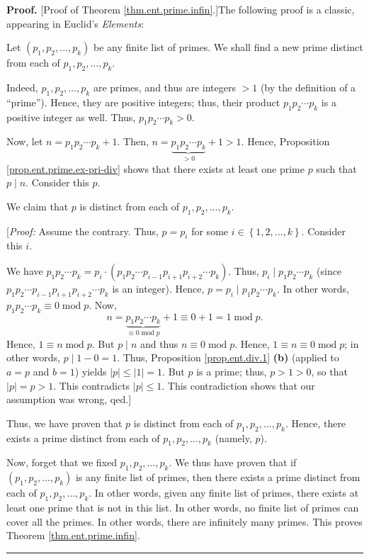 \documentclass[numbers=enddot,12pt,final,onecolumn,notitlepage]{scrartcl}%
\numberwithin{exer}{subsection}
\theoremstyle{definition}
\newenvironment{proof}[1][Proof]{\noindent\textbf{#1.} }{\ \rule{0.5em}{0.5em}}
\begin{document}
\begin{proof}
[Proof of Theorem \ref{thm.ent.prime.infin}.]The following proof is a classic,
appearing in Euclid's \textit{Elements}:

Let $\left(  p_{1},p_{2},\ldots,p_{k}\right)  $ be any finite list of primes.
We shall find a new prime distinct from each of $p_{1},p_{2},\ldots,p_{k}$.

Indeed, $p_{1},p_{2},\ldots,p_{k}$ are primes, and thus are integers $>1$ (by
the definition of a \textquotedblleft prime\textquotedblright). Hence, they
are positive integers; thus, their product $p_{1}p_{2}\cdots p_{k}$ is a
positive integer as well. Thus, $p_{1}p_{2}\cdots p_{k}>0$.

Now, let $n=p_{1}p_{2}\cdots p_{k}+1$. Then, $n=\underbrace{p_{1}p_{2}\cdots
p_{k}}_{>0}+1>1$. Hence, Proposition \ref{prop.ent.prime.ex-pri-div} shows
that there exists at least one prime $p$ such that $p\mid n$. Consider this
$p$.

We claim that $p$ is distinct from each of $p_{1},p_{2},\ldots,p_{k}$.

[\textit{Proof:} Assume the contrary. Thus, $p=p_{i}$ for some $i\in\left\{
1,2,\ldots,k\right\}  $. Consider this $i$.

We have $p_{1}p_{2}\cdots p_{k}=p_{i}\cdot\left(  p_{1}p_{2}\cdots
p_{i-1}p_{i+1}p_{i+2}\cdots p_{k}\right)  $. Thus, $p_{i}\mid p_{1}p_{2}\cdots
p_{k}$ (since $p_{1}p_{2}\cdots p_{i-1}p_{i+1}p_{i+2}\cdots p_{k}$ is an
integer). Hence, $p=p_{i}\mid p_{1}p_{2}\cdots p_{k}$. In other words,
$p_{1}p_{2}\cdots p_{k}\equiv0\operatorname{mod}p$. Now,%
\[
n=\underbrace{p_{1}p_{2}\cdots p_{k}}_{\equiv0\operatorname{mod}p}%
+1\equiv0+1=1\operatorname{mod}p.
\]
Hence, $1\equiv n\operatorname{mod}p$. But $p\mid n$ and thus $n\equiv
0\operatorname{mod}p$. Hence, $1\equiv n\equiv0\operatorname{mod}p$; in other
words, $p\mid1-0=1$. Thus, Proposition \ref{prop.ent.div.1} \textbf{(b)}
(applied to $a=p$ and $b=1$) yields $\left\vert p\right\vert \leq\left\vert
1\right\vert =1$. But $p$ is a prime; thus, $p>1>0$, so that $\left\vert
p\right\vert =p>1$. This contradicts $\left\vert p\right\vert \leq1$. This
contradiction shows that our assumption was wrong, qed.]

Thus, we have proven that $p$ is distinct from each of $p_{1},p_{2}%
,\ldots,p_{k}$. Hence, there exists a prime distinct from each of $p_{1}%
,p_{2},\ldots,p_{k}$ (namely, $p$).

Now, forget that we fixed $p_{1},p_{2},\ldots,p_{k}$. We thus have proven that
if $\left(  p_{1},p_{2},\ldots,p_{k}\right)  $ is any finite list of primes,
then there exists a prime distinct from each of $p_{1},p_{2},\ldots,p_{k}$. In
other words, given any finite list of primes, there exists at least one prime
that is not in this list. In other words, no finite list of primes can cover
all the primes. In other words, there are infinitely many primes. This proves
Theorem \ref{thm.ent.prime.infin}.
\end{proof}
\end{document}
